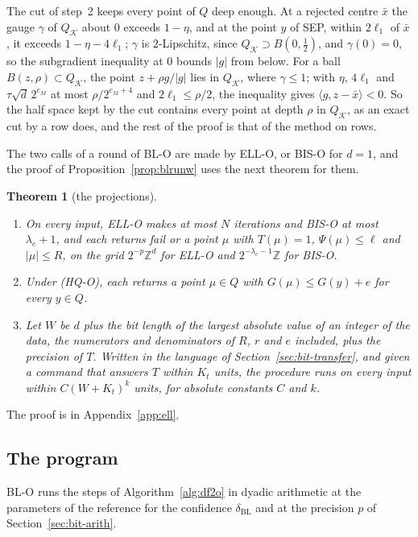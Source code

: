 \documentclass[11pt]{amsart}
\newtheorem{theorem}{Theorem}[section]
\theoremstyle{definition}
\numberwithin{equation}{section}
\newcommand{\cK}{\mathcal{K}}
\newcommand{\ip}[1]{\langle #1\rangle}
\begin{document}
The cut of step~2 keeps every point of $Q$ deep enough. At a rejected centre $\bar x$ the gauge $\gamma$ of $Q_\cK$ about $0$ exceeds $1-\eta$, and at the point $y$ of SEP, within $2\ell_1$ of $\bar x$, it exceeds $1-\eta-4\ell_1$; $\gamma$ is $2$-Lipschitz, since $Q_\cK\supset B(0,\frac12)$, and $\gamma(0)=0$, so the subgradient inequality at $0$ bounds $|g|$ from below. For a ball $B(z,\rho)\subset Q_\cK$, the point $z+\rho g/|g|$ lies in $Q_\cK$, where $\gamma\le1$; with $\eta$, $4\ell_1$ and $\tau\sqrt d\,2^{e_M}$ at most $\rho/2^{e_M+4}$ and $2\ell_1\le\rho/2$, the inequality gives $\ip{g,z-\bar x}<0$. So the half space kept by the cut contains every point at depth $\rho$ in $Q_\cK$, as an exact cut by a row does, and the rest of the proof is that of the method on rows.

The two calls of a round of BL-O are made by ELL-O, or BIS-O for $d=1$, and the proof of Proposition~\ref{prop:blrunw} uses the next theorem for them.

\begin{theorem}[the projections]\label{thm:ellr}
\begin{enumerate}[label=(\alph*)]
\item On every input, ELL-O makes at most $N$ iterations and BIS-O at most $\lambda_e+1$, and each returns fail or a point $\mu$ with $T(\mu)=1$, $\Psi(\mu)\le\ell$ and $|\mu|\le R$, on the grid $2^{-p}\mathbb Z^d$ for ELL-O and $2^{-\lambda_e-1}\mathbb Z$ for BIS-O.
\item Under (HQ-O), each returns a point $\mu\in Q$ with $G(\mu)\le G(y)+e$ for every $y\in Q$.
\item Let $W$ be $d$ plus the bit length of the largest absolute value of an integer of the data, the numerators and denominators of $R$, $r$ and $e$ included, plus the precision of $T$. Written in the language of Section~\ref{sec:bit-transfer}, and given a command that answers $T$ within $K_t$ units, the procedure runs on every input within $C(W+K_t)^k$ units, for absolute constants $C$ and $k$.
\end{enumerate}
\end{theorem}

The proof is in Appendix~\ref{app:ell}.

\subsection{The program}\label{sec:bit-prog}

BL-O runs the steps of Algorithm~\ref{alg:df2o} in dyadic arithmetic at the parameters of the reference for the confidence $\delta_{\mathrm{BL}}$ and at the precision $p$ of Section~\ref{sec:bit-arith}.
\end{document}
